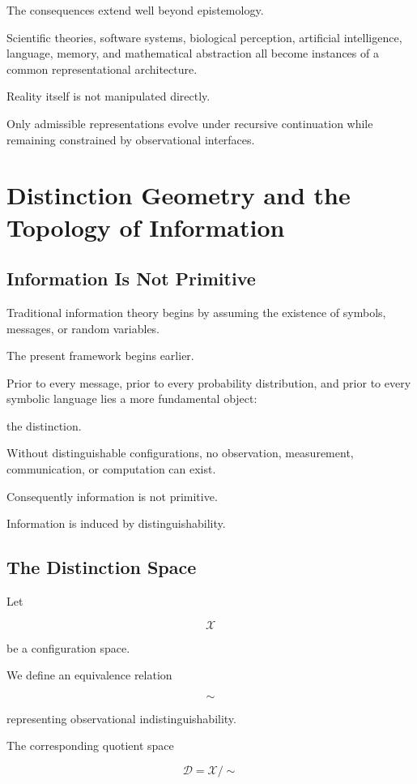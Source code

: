 \documentclass[11pt,oneside]{book}
\numberwithin{equation}{chapter}
\theoremstyle{definition}
\theoremstyle{plain}
\begin{document}
The consequences extend well beyond epistemology.

Scientific theories, software systems, biological perception, artificial
intelligence, language, memory, and mathematical abstraction all become
instances of a common representational architecture.

Reality itself is not manipulated directly.

Only admissible representations evolve under recursive continuation while
remaining constrained by observational interfaces.

\chapter{Distinction Geometry and the Topology of Information}

\section{Information Is Not Primitive}

Traditional information theory begins by assuming the existence of symbols,
messages, or random variables.

The present framework begins earlier.

Prior to every message, prior to every probability distribution, and prior to
every symbolic language lies a more fundamental object:

the distinction.

Without distinguishable configurations, no observation, measurement,
communication, or computation can exist.

Consequently information is not primitive.

Information is induced by distinguishability.

\section{The Distinction Space}

Let

\[
\mathcal{X}
\]

be a configuration space.

We define an equivalence relation

\[
\sim
\]

representing observational indistinguishability.

The corresponding quotient space

\[
\mathcal{D}
=
\mathcal{X}/\sim
\]
\end{document}
